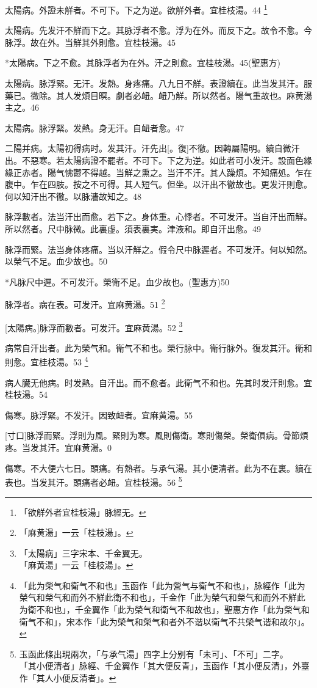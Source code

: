 \documentclass[12pt,oneside,UTF8,b5paper]{ctexbook}她她她她她她她
\begin{document}
太陽病。外證未觧者。不可下。下之为逆。欲觧外者。宜桂枝湯。44
	\footnote{「欲觧外者宜桂枝湯」脉經无。}

太陽病。先发汗不觧而下之。其脉浮者不愈。浮为在外。而反下之。故令不愈。今脉浮。故在外。当觧其外則愈。宜桂枝湯。45

*太陽病。下之不愈。其脉浮者为在外。汗之則愈。宜桂枝湯。45(聖惠方)

太陽病。脉浮緊。无汗。发熱。身疼痛。八九日不觧。表證續在。此当发其汗。服藥已。微除。其人发煩目暝。劇者必衄。衄乃觧。所以然者。陽气重故也。麻黄湯主之。46

太陽病。脉浮緊。发熱。身无汗。自衄者愈。47

二陽并病。太陽初得病时。发其汗。汗先出[。復]不徹。因轉屬陽明。續自微汗出。不惡寒。若太陽病證不罷者。不可下。下之为逆。如此者可小发汗。設面色緣緣正赤者。陽气怫鬱不得越。当觧之熏之。当汗不汗。其人躁煩。不知痛処。乍在腹中。乍在四肢。按之不可得。其人短气。但坐。以汗出不徹故也。更发汗則愈。何以知汗出不徹。以脉濇故知之。48

脉浮數者。法当汗出而愈。若下之。身体重。心悸者。不可发汗。当自汗出而觧。所以然者。尺中脉微。此裏虚。須表裏実。津液和。即自汗出愈。49

脉浮而緊。法当身体疼痛。当以汗觧之。假令尺中脉遲者。不可发汗。何以知然。以榮气不足。血少故也。50

*凡脉尺中遲。不可发汗。榮衛不足。血少故也。(聖惠方)50

脉浮者。病在表。可发汗。宜麻黄湯。51
	\footnote{「麻黄湯」一云「桂枝湯」。}

[太陽病。]脉浮而數者。可发汗。宜麻黄湯。52
	\footnote{「太陽病」三字宋本、千金翼无。\\「麻黄湯」一云「桂枝湯」。}

病常自汗出者。此为榮气和。衛气不和也。榮行脉中。衛行脉外。復发其汗。衛和則愈。宜桂枝湯。53
	\footnote{「此为榮气和衛气不和也」玉函作「此为營气与衛气不和也」，脉經作「此为榮气和榮气和而外不觧此衛不和也」，千金作「此为榮气和榮气和而外不觧此为衛不和也」，千金翼作「此为榮气和衛气不和故也」，聖惠方作「此为榮气和衛气不和」，宋本作「此为榮气和榮气和者外不谐以衛气不共榮气谐和故尔」。}

病人臓无他病。时发熱。自汗出。而不愈者。此衛气不和也。先其时发汗則愈。宜桂枝湯。54

傷寒。脉浮緊。不发汗。因致衄者。宜麻黄湯。55

[寸口]脉浮而緊。浮則为風。緊則为寒。風則傷衛。寒則傷榮。榮衛俱病。骨節煩疼。当发其汗。宜麻黄湯。0

傷寒。不大便六七日。頭痛。有熱者。与承气湯。其小便清者。此为不在裏。續在表也。当发其汗。頭痛者必衄。宜桂枝湯。56
	\footnote{玉函此條出現兩次，「与承气湯」四字上分别有「未可」、「不可」二字。\\「其小便清者」脉經、千金翼作「其大便反青」，玉函作「其小便反清」，外臺作「其人小便反清者」。}
\end{document}
